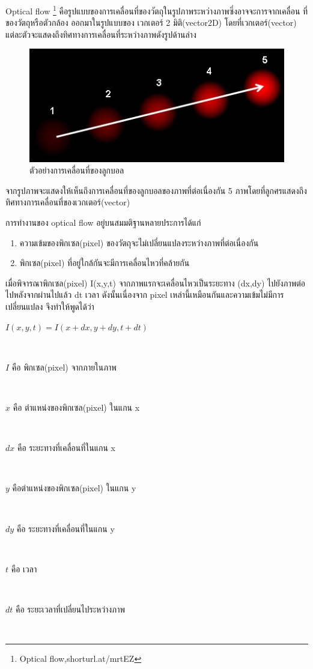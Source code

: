 Optical flow \footnote{Optical flow,shorturl.at/mrtEZ}  คือรูปแบบของการเคลื่อนที่ของวัตถุในรูปภาพระหว่างภาพซึ่งอาจจะการจากเคลื่อน ที่ของวัตถุหรือตัวกล้อง ออกมาในรูปแบบของ เวกเตอร์ 2 มิติ(vector2D) โดยที่เวกเตอร์(vector) แต่ละตัวจะแสดงถึงทิศทางการเคลื่อนที่ระหว่างภาพดังรูปด้านล่าง

\begin{figure}[!ht]
	\centering
	\includegraphics[width=1\textwidth]{chapter2/images/vector_optical.png}
		\caption{ตัวอย่างการเคลื่อนที่ของลูกบอล}
    	\label{fig:vector_optical}
\end{figure}

จากรูปภาพจะแสดงให้เห็นถึงการเคลื่อนที่ของลูกบอลของภาพที่ต่อเนื่องกัน 5 ภาพโดยที่ลูกศรแสดงถึงทิศทางการเคลื่อนที่ของเวกเตอร์(vector)
\\
\clearpage
\par
การทำงานของ optical flow อยู่บนสมมติฐานหลายประการได้แก่
\begin{enumerate}
	\setlength\itemsep{-0.25em}
	\item ความเข้มของพิกเซล(pixel) ของวัตถุจะไม่เปลี่ยนแปลงระหว่างภาพที่ต่อเนื่องกัน
	\item พิกเซล(pixel) ที่อยู่ใกล้กันจะมีการเคลื่อนไหวที่คล้ายกัน
\end{enumerate}

เมื่อพิจารณาพิกเซล(pixel) I(x,y,t) จากภาพแรกจะเคลื่อนไหวเป็นระยะทาง (dx,dy) ไปยังภาพต่อไปหลังจากผ่านไปแล้ว dt เวลา ดังนั้นเนื่องจาก pixel เหล่านี้เหมือนกันและความเข้มไม่มีการเปลี่ยนแปลง จึงทำให้พูดได้ว่า
\\
\centerline{$I(x,y,t) = I(x + dx, y + dy, t + dt)$}		\\
\centerline{$I$ คือ พิกเซล(pixel) จากภายในภาพ}		\\
\centerline{$x$ คือ ตำแหน่งของพิกเซล(pixel) ในแกน x} 	\\
\centerline{$dx$ คือ ระยะทางที่เคลื่อนที่ในแกน x} 		\\
\centerline{$y$ คือตำแหน่งของพิกเซล(pixel) ในแกน y} 	\\
\centerline{$dy$ คือ ระยะทางที่เคลื่อนที่ในแกน y}		\\
\centerline{$t$ คือ เวลา}						\\
\centerline{$dt$ คือ ระยะเวลาที่เปลี่ยนไประหว่างภาพ} 	\\

